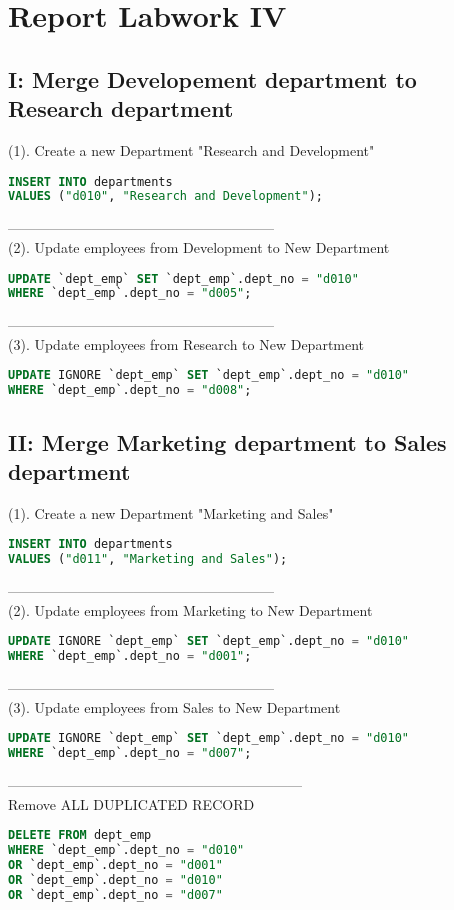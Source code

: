 \documentclass[12pt]{report}
\begin{document}
\section*{Report Labwork IV}

\subsection*{I: Merge Developement department to Research department}

(1). Create a new Department "Research and Development"
\begin{lstlisting}[language=sql]
INSERT INTO departments 
VALUES ("d010", "Research and Development");
\end{lstlisting}
---------------------------------------------------------
\\
(2). Update employees from Development to New Department
\begin{lstlisting}[language=sql]
UPDATE `dept_emp` SET `dept_emp`.dept_no = "d010" 
WHERE `dept_emp`.dept_no = "d005";
\end{lstlisting}
---------------------------------------------------------
\\
(3). Update employees from Research to New Department
\begin{lstlisting}[language=sql]
UPDATE IGNORE `dept_emp` SET `dept_emp`.dept_no = "d010" 
WHERE `dept_emp`.dept_no = "d008";
\end{lstlisting}


\subsection*{II: Merge Marketing department to Sales department}

(1). Create a new Department "Marketing and Sales"
\begin{lstlisting}[language=sql]
INSERT INTO departments 
VALUES ("d011", "Marketing and Sales");
\end{lstlisting}
---------------------------------------------------------
\\
(2). Update employees from Marketing to New Department
\begin{lstlisting}[language=sql]
UPDATE IGNORE `dept_emp` SET `dept_emp`.dept_no = "d010" 
WHERE `dept_emp`.dept_no = "d001";
\end{lstlisting}
---------------------------------------------------------
\\
(3). Update employees from Sales to New Department
\begin{lstlisting}[language=sql]
UPDATE IGNORE `dept_emp` SET `dept_emp`.dept_no = "d010" 
WHERE `dept_emp`.dept_no = "d007";
\end{lstlisting}


---------------------------------------------------------------
\\
Remove ALL DUPLICATED RECORD
\begin{lstlisting}[language=sql]
DELETE FROM dept_emp 
WHERE `dept_emp`.dept_no = "d010" 
OR `dept_emp`.dept_no = "d001" 
OR `dept_emp`.dept_no = "d010" 
OR `dept_emp`.dept_no = "d007" 
\end{lstlisting}
\end{document}

